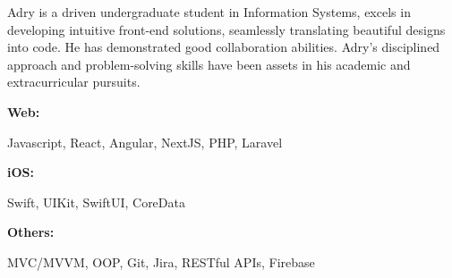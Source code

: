 \documentclass[9pt]{developercv}
\begin{document}
\begin{minipage}[t]{0.46\textwidth}
	\vspace{-6pt}
   
	Adry is a driven undergraduate student in Information Systems, excels in developing intuitive front-end solutions, seamlessly translating beautiful designs into code. He has demonstrated good collaboration abilities. Adry's disciplined approach and problem-solving skills have been assets in his academic and extracurricular pursuits. \\
\end{minipage}
\hfill %
\begin{minipage}[t]{0.465\textwidth}
    \vspace{-6pt}
    
    \begin{minipage}[t]{0.2\textwidth}
        \textbf{Web:}
    \end{minipage}
    \hfill
    \begin{minipage}[t]{0.73\textwidth}
      Javascript, React, Angular, NextJS, PHP, Laravel
    \end{minipage}
    \vspace{2mm}
    
    \begin{minipage}[t]{0.2\textwidth}
        \textbf{iOS:}
    \end{minipage}
    \hfill
    \begin{minipage}[t]{0.73\textwidth}
      Swift, UIKit, SwiftUI, CoreData
    \end{minipage}
    \vspace{1mm}

    \begin{minipage}[t]{0.2\textwidth}
        \textbf{Others:}
    \end{minipage}
    \hfill
    \begin{minipage}[t]{0.73\textwidth}
      MVC/MVVM, OOP, Git, Jira, RESTful APIs, Firebase
    \end{minipage}
    
\end{minipage}
\end{document}
